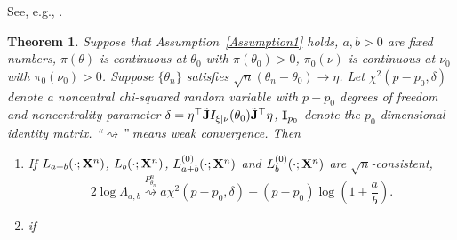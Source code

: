 \documentclass[11pt]{article}
\theoremstyle{plain}
\newtheorem{theorem}{\quad\quad Theorem}
\theoremstyle{definition}
\theoremstyle{remark}
\begin{document}
See, e.g., \cite{Erven2014}.



    \begin{theorem}\label{Thm:maintheorem}
        Suppose that Assumption~\ref{Assumption1} holds, $a,b>0$ are fixed numbers, $\pi(\theta)$ is continuous at $\theta_0$ with $\pi(\theta_0)>0$, $\pi_0(\nu)$ is continuous at $\nu_0$ with $\pi_0(\nu_0)>0$.
        Suppose $\{\theta_n\}$ satisfies $\sqrt{n}(\theta_n-\theta_0)\to \eta$.
        Let $\chi^2(p-p_0,\delta)$ denote a noncentral chi-squared random variable with $p-p_0$ degrees of freedom and noncentrality parameter $\delta=\eta^\top\tilde {\mathbf{J}} I_{\xi|\nu}(\theta_0) \tilde{\mathbf{J}}^\top\eta$,  $\mathbf{I}_{p_0}$ denote the $p_0$ dimensional identity matrix.
``$\rightsquigarrow$'' means weak convergence.
        Then 
        \begin{enumerate}
            \item 
                If
$L_{a+b}(\cdot;\mathbf{X}^{n})$, $L_b(\cdot;\mathbf{X}^{n})$, $L_{a+b}^{(0)}(\cdot;\mathbf{X}^{n})$ and $L_b^{(0)}(\cdot;\mathbf{X}^{n})$ are $\sqrt{n}$-consistent, 
        $$
        2\log \Lambda_{a,b}\overset{P^n_{\theta_n}}{\rightsquigarrow} 
        {a}\chi^2(p-p_0,\delta)
-{(p-p_0)}\log (1+\frac{a}{b})
.
        $$
    \item
        if
        \end{enumerate}
    \end{theorem}
\end{document}
